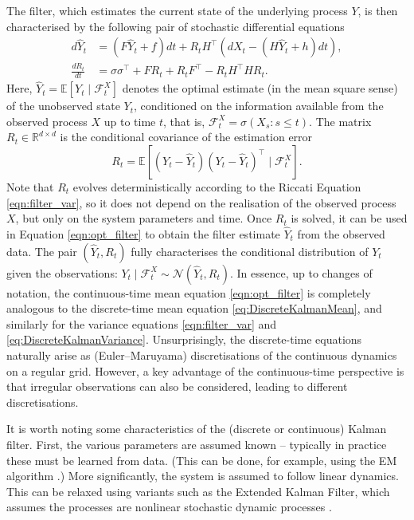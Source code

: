 \documentclass[a4paper, 12pt]{article}
\theoremstyle{remark}
\begin{document}
The filter, which estimates the current state of the underlying process $Y$, is then characterised by the following pair of stochastic differential equations
\begin{align}
    d\hat Y_t &= (F \hat Y_t +f)dt + R_tH^\top (dX_t -(H\hat Y_t+h)dt),\label{eqn:opt_filter}\\
    \frac{dR_t}{dt} &= \sigma \sigma^\top+F R_t + R_t F^\top - R_t H^\top H R_t. \label{eqn:filter_var}
\end{align}
Here, \(\hat{Y}_t = \mathbb{E}[Y_t \mid \mathcal{F}^X_t]\) denotes the optimal estimate (in the mean square sense) of the unobserved state \(Y_t\), conditioned on the information available from the observed process \(X\) up to time \(t\), that is, \(\mathcal{F}^X_t = \sigma(X_s : s \leq t)\).
The matrix \(R_t \in \mathbb{R}^{d \times d}\) is the conditional covariance of the estimation error
\[
R_t = \mathbb{E}[(Y_t - \hat{Y}_t)(Y_t - \hat{Y}_t)^\top \mid \mathcal{F}^X_t].
\]
Note that \(R_t\) evolves deterministically according to the Riccati Equation \eqref{eqn:filter_var}, so it does not depend on the realisation of the observed process \(X\), but only on the system parameters and time. Once \(R_t\) is solved, it can be used in Equation \eqref{eqn:opt_filter} to obtain the filter estimate \(\hat{Y}_t\) from the observed data. The pair \((\hat{Y}_t, R_t)\) fully characterises the conditional distribution of \(Y_t\) given the observations: \(Y_t \mid \mathcal{F}^X_t \sim \mathcal{N}(\hat{Y}_t, R_t)\). In essence, up to changes of notation, the continuous-time mean equation \eqref{eqn:opt_filter} is completely analogous to the discrete-time mean equation \eqref{eq:DiscreteKalmanMean}, and similarly for the variance equations \eqref{eqn:filter_var} and \eqref{eq:DiscreteKalmanVariance}. Unsurprisingly, the discrete-time equations naturally arise as (Euler--Maruyama) discretisations of the continuous dynamics on a regular grid. However, a key advantage of the continuous-time perspective is that irregular observations can also be considered, leading to different discretisations.

It is worth noting some characteristics of the (discrete or continuous) Kalman filter. First, the various parameters are assumed known -- typically in practice these must be learned from data.  (This can be done, for example, using the EM algorithm \citep{dempster1977maximum}.) More significantly, the system is assumed to follow linear dynamics. This can be relaxed using variants such as the Extended Kalman Filter, which assumes the processes are nonlinear stochastic dynamic processes \citep{jazwinski1970stochastic}. 
\end{document}
